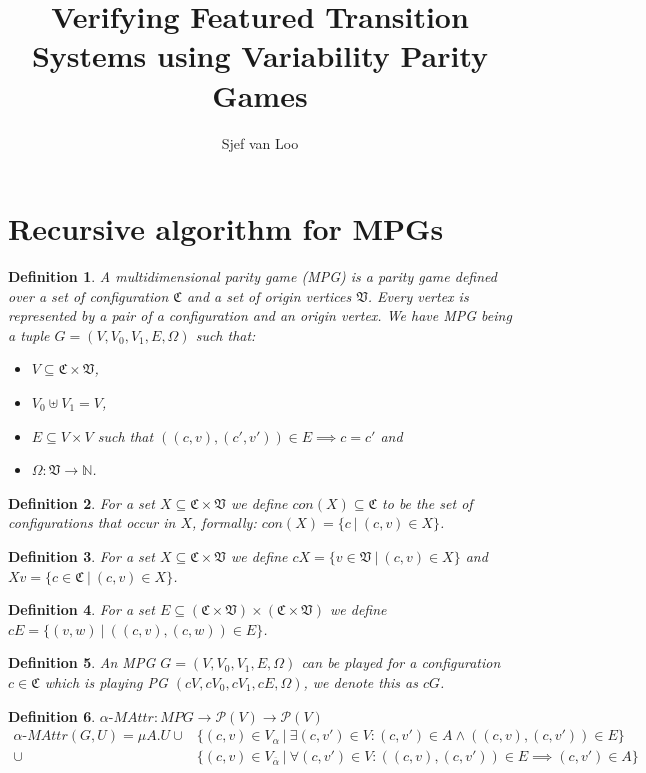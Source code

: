 \documentclass[]{article}
\title{Verifying Featured Transition Systems using Variability Parity Games}
\author{Sjef van Loo}
\newtheorem{definition}{Definition}[section]
\begin{document}
\section{Recursive algorithm for MPGs}
	\begin{definition}
		A multidimensional parity game (MPG) is a parity game defined over a set of configuration $\mathfrak{C}$ and a set of origin vertices $\mathfrak{V}$. Every vertex is represented by a pair of a configuration and an origin vertex. We have MPG being a tuple $G = (V,V_0,V_1,E,\Omega)$ such that:
		\begin{itemize}
			\item $V \subseteq \mathfrak{C} \times \mathfrak{V}$,
			\item $V_0 \uplus V_1 = V$,
			\item $E \subseteq V \times V$ such that $((c,v),(c',v')) \in E \implies c=c'$ and
			\item $\Omega : \mathfrak{V} \rightarrow \mathbb{N}$.
		\end{itemize}
	\end{definition}
	\begin{definition}
		For a set $X \subseteq \mathfrak{C} \times \mathfrak{V}$ we define $con(X) \subseteq \mathfrak{C}$ to be the set of configurations that occur in $X$, formally: $con(X) = \{c\ |\ (c,v) \in X\}$.
	\end{definition}
	\begin{definition}
		For a set $X \subseteq \mathfrak{C} \times \mathfrak{V}$ we define $cX = \{ v \in \mathfrak{V}\ |\ (c,v) \in X\}$ and $Xv = \{ c \in \mathfrak{C}\ |\ (c,v) \in X\}$.
	\end{definition}
	\begin{definition}
		For a set $E \subseteq (\mathfrak{C} \times \mathfrak{V}) \times (\mathfrak{C} \times \mathfrak{V})$ we define $cE = \{(v,w)\ |\ ((c,v),(c,w)) \in E \}$.
	\end{definition}
	\begin{definition}
		An MPG $G = (V,V_0,V_1,E,\Omega)$ can be played for a configuration $c \in \mathfrak{C}$ which is playing PG $(cV,cV_0,cV_1,cE,\Omega)$, we denote this as $cG$.
	\end{definition}
	
	\begin{definition}
		$\alpha\textit{-MAttr} : \textit{MPG} \rightarrow \mathcal{P}(V) \rightarrow \mathcal{P}(V)$\\
		\begin{align*}
		\alpha\textit{-MAttr}(G, U) = \mu A .U 
		\cup &\{(c,v) \in V_\alpha\ |\ \exists (c,v') \in V : (c, v') \in A \wedge ((c,v), (c,v')) \in E \}\\
		\cup &\{(c,v) \in V_{\overline{\alpha}}\ |\ \forall (c,v') \in V :((c,v), (c,v')) \in E \implies (c, v') \in A \}
		\end{align*}
	\end{definition}
\end{document}
